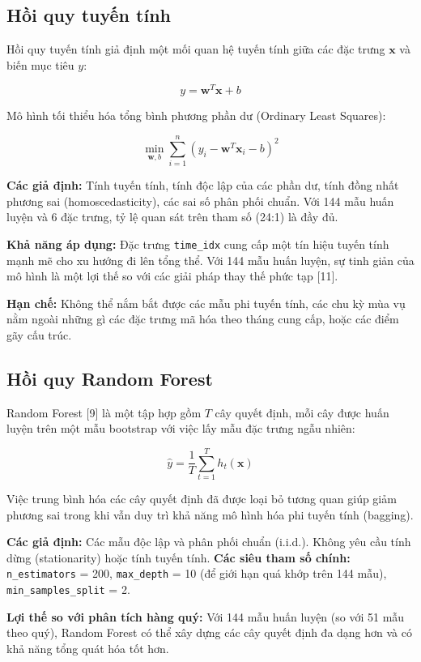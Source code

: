 \documentclass[
]{article}
\begin{document}
\subsection{Hồi quy tuyến tính}\label{hux1ed3i-quy-tuyux1ebfn-tuxednh}

Hồi quy tuyến tính giả định một mối quan hệ tuyến tính giữa các đặc
trưng \(\mathbf{x}\) và biến mục tiêu \(y\):

\[y = \mathbf{w}^T \mathbf{x} + b\]

Mô hình tối thiểu hóa tổng bình phương phần dư (Ordinary Least Squares):

\[\min_{\mathbf{w}, b} \sum_{i=1}^{n} (y_i - \mathbf{w}^T \mathbf{x}_i - b)^2\]

\textbf{Các giả định:} Tính tuyến tính, tính độc lập của các phần dư,
tính đồng nhất phương sai (homoscedasticity), các sai số phân phối
chuẩn. Với 144 mẫu huấn luyện và 6 đặc trưng, tỷ lệ quan sát trên tham
số (24:1) là đầy đủ.

\textbf{Khả năng áp dụng:} Đặc trưng \texttt{time\_idx} cung cấp một tín
hiệu tuyến tính mạnh mẽ cho xu hướng đi lên tổng thể. Với 144 mẫu huấn
luyện, sự tinh giản của mô hình là một lợi thế so với các giải pháp thay
thế phức tạp {[}11{]}.

\textbf{Hạn chế:} Không thể nắm bắt được các mẫu phi tuyến tính, các chu
kỳ mùa vụ nằm ngoài những gì các đặc trưng mã hóa theo tháng cung cấp,
hoặc các điểm gãy cấu trúc.

\subsection{Hồi quy Random Forest}\label{hux1ed3i-quy-random-forest}

Random Forest {[}9{]} là một tập hợp gồm \(T\) cây quyết định, mỗi cây
được huấn luyện trên một mẫu bootstrap với việc lấy mẫu đặc trưng ngẫu
nhiên:

\[\hat{y} = \frac{1}{T} \sum_{t=1}^{T} h_t(\mathbf{x})\]

Việc trung bình hóa các cây quyết định đã được loại bỏ tương quan giúp
giảm phương sai trong khi vẫn duy trì khả năng mô hình hóa phi tuyến
tính (bagging).

\textbf{Các giả định:} Các mẫu độc lập và phân phối chuẩn (i.i.d.).
Không yêu cầu tính dừng (stationarity) hoặc tính tuyến tính. \textbf{Các
siêu tham số chính:} \texttt{n\_estimators} = 200, \texttt{max\_depth} =
10 (để giới hạn quá khớp trên 144 mẫu), \texttt{min\_samples\_split} =
2.

\textbf{Lợi thế so với phân tích hàng quý:} Với 144 mẫu huấn luyện (so
với 51 mẫu theo quý), Random Forest có thể xây dựng các cây quyết định
đa dạng hơn và có khả năng tổng quát hóa tốt hơn.
\end{document}
